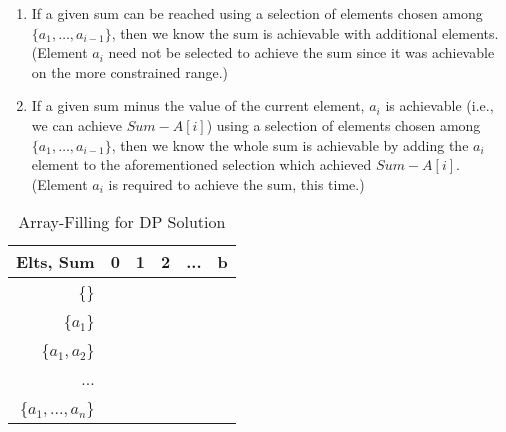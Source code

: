 \documentclass[conference]{styles/acmsiggraph}
\newcommand{\?}{\stackrel{?}{=}}
\begin{document}
\begin{enumerate}
    \item If a given sum can be reached using a selection of elements chosen among $\{a_1,\ldots,a_{i-1}\}$, then we know the sum is achievable with additional elements. (Element $a_i$ need not be selected to achieve the sum since it was achievable on the more constrained range.)
    \item If a given sum minus the value of the current element, $a_i$ is achievable (i.e., we can achieve $Sum - A[i]$) using a selection of elements chosen among $\{a_1,\ldots,a_{i-1}\}$, then we know the whole sum is achievable by adding the $a_i$ element to the aforementioned selection which achieved $Sum - A[i]$. (Element $a_i$ is required to achieve the sum, this time.)
\end{enumerate}
\FloatBarrier

\begin{table}[htpb!]
\centering
\begin{tabular}{r|lllll|}
\hline
Elts, Sum  & 0                     & 1                     & 2                     & ...                   & b \\ \hline
\{\}                & \multicolumn{1}{l|}{} & \multicolumn{1}{l|}{} & \multicolumn{1}{l|}{} & \multicolumn{1}{l|}{} &   \\ \cline{2-6} 
\{$a_1$\}           & \multicolumn{1}{l|}{} & \multicolumn{1}{l|}{} & \multicolumn{1}{l|}{} & \multicolumn{1}{l|}{} &   \\ \cline{2-6} 
\{$a_1, a_2$\}      & \multicolumn{1}{l|}{} & \multicolumn{1}{l|}{} & \multicolumn{1}{l|}{} & \multicolumn{1}{l|}{} &   \\ \cline{2-6} 
...                 & \multicolumn{1}{l|}{} & \multicolumn{1}{l|}{} & \multicolumn{1}{l|}{} & \multicolumn{1}{l|}{} &   \\ \cline{2-6} 
\{$a_1, ..., a_n$\} & \multicolumn{1}{l|}{} & \multicolumn{1}{l|}{} & \multicolumn{1}{l|}{} & \multicolumn{1}{l|}{} &   \\ \hline
\end{tabular}
\caption{Array-Filling for DP Solution}
\end{table}
\FloatBarrier
\end{document}
